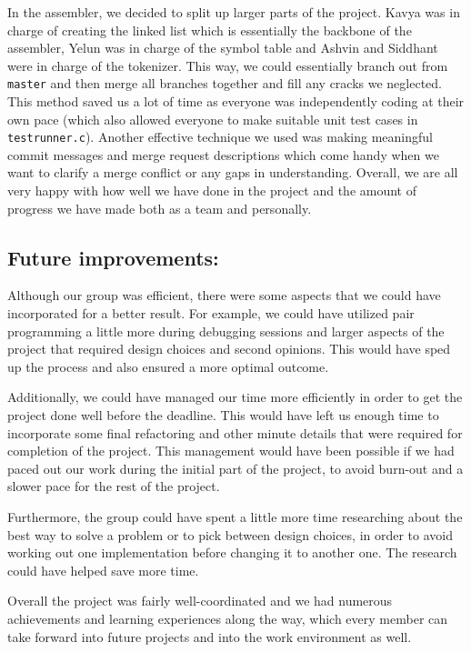 \documentclass[a4paper]{article}
\begin{document}
In the assembler, we decided to split up larger parts of the project. Kavya was in charge of creating the linked list which is essentially the backbone of the assembler, Yelun was in charge of the symbol table and Ashvin and Siddhant were in charge of the tokenizer. This way, we could essentially branch out from \verb|master| and then merge all branches together and fill any cracks we neglected. This method saved us a lot of time as everyone was independently coding at their own pace (which also allowed everyone to make suitable unit test cases in \verb|testrunner.c|). Another effective technique we used was making meaningful commit messages and merge request descriptions which come handy when we want to clarify a merge conflict or any gaps in understanding. Overall, we are all very happy with how well we have done in the project and the amount of progress we have made both as a team and personally.

\subsection{Future improvements:}
Although our group was efficient, there were some aspects that we could have incorporated for a better result. For example, we could have utilized pair programming a little more during debugging sessions and larger aspects of the project that required design choices and second opinions. This would have sped up the process and also ensured a more optimal outcome.

Additionally, we could have managed our time more efficiently in order to get the project done well before the deadline. This would have left us enough time to incorporate some final refactoring and other minute details that were required for completion of the project. This management would have been possible if we had paced out our work during the initial part of the project, to avoid burn-out and a slower pace for the rest of the project. 

Furthermore, the group could have spent a little more time researching about the best way to solve a problem or to pick between design choices, in order to avoid working out one implementation before changing it to another one. The research could have helped save more time. 

Overall the project was fairly well-coordinated and we had numerous achievements and learning experiences along the way, which every member can take forward into future projects and into the work environment as well.
\end{document}
